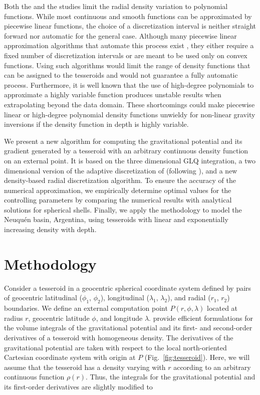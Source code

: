 \documentclass[extra, referee]{gji}
\begin{document}
Both the \citet{Lin2018} and the \citet{Fukushima2018} studies limit the radial density
variation to polynomial functions.
While most continuous and smooth functions can be approximated by piecewise linear
functions, the choice of a discretization interval is neither straight forward nor
automatic for the general case.
Although many piecewise linear approximation algorithms that automate this process
exist \citep{Ketkov1969, Vandewalle1975, Imamoto2008, Ahmadi2013}, they either require
a fixed number of discretization intervals or are meant to be used only on convex
functions.
Using such algorithms would limit the range of density functions that can be assigned 
to the tesseroids and would not guarantee a fully automatic process.
Furthermore, it is well known that the use of high-degree polynomials to approximate a
highly variable function produces unstable results when extrapolating beyond the data
domain.
These shortcomings could make piecewise linear or high-degree polynomial density
functions unwieldy for non-linear gravity inversions \citep[e.g.][]{Uieda2017} if the
density function in depth is highly variable.

We present a new algorithm for computing the gravitational potential and its gradient
generated by a tesseroid with an arbitrary continuous density function on an external
point.
It is based on the three dimensional GLQ integration, a two dimensional version of the
adaptive discretization of \citet{Uieda2016} (following \citet{Lin2018}),
and a new density-based radial discretization algorithm.
To ensure the accuracy of the numerical approximation, we empirically determine
optimal values for the controlling parameters by comparing the numerical results with
analytical solutions for spherical shells.
Finally, we apply the methodology to model the Neuqu\'en basin, Argentina, using
tesseroids with linear and exponentially increasing density with depth.



\section{Methodology}

Consider a tesseroid in a geocentric spherical coordinate system defined by
pairs of geocentric latitudinal ($\phi_1$, $\phi_2$), longitudinal ($\lambda_1$,
$\lambda_2$), and radial ($r_1$, $r_2$) boundaries.
We define an external computation point $P(r, \phi, \lambda)$ located at radius $r$,
geocentric latitude $\phi$, and longitude $\lambda$.
\citet{Grombein2013} provide efficient formulations for the volume integrals of the
gravitational potential and its first- and second-order derivatives of a tesseroid with
homogeneous density.
The derivatives of the gravitational potential are taken with
respect to the local north-oriented Cartesian coordinate system with origin at $P$
(Fig.~\ref{fig:tesseroid}).
Here, we will assume that the tesseroid has a density varying with $r$ according to an
arbitrary continuous function $\rho(r)$.
Thus, the integrals for the gravitational potential and its first-order derivatives are
slightly modified to
\end{document}
